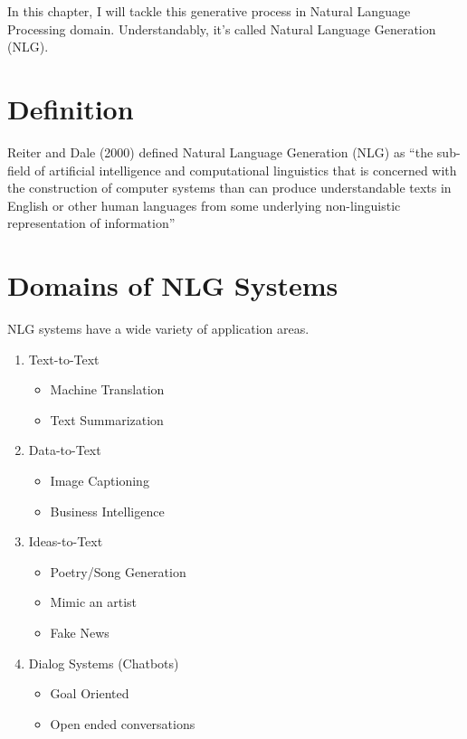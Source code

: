 \documentclass[]{krantz}
\providecommand{\tightlist}{%
  \setlength{\itemsep}{0pt}\setlength{\parskip}{0pt}}
\begin{document}
In this chapter, I will tackle this generative process in Natural Language Processing domain. Understandably, it's called Natural Language Generation (NLG).

\hypertarget{definition}{%
\section{Definition}\label{definition}}

Reiter and Dale (2000) defined Natural Language Generation (NLG) as ``the sub-field of artificial intelligence and computational linguistics that is concerned with the construction of computer systems than can produce understandable texts in English or other human languages from some underlying non-linguistic representation of information''

\hypertarget{domains-of-nlg-systems}{%
\section{Domains of NLG Systems}\label{domains-of-nlg-systems}}

NLG systems have a wide variety of application areas.

\begin{enumerate}
\def\labelenumi{\arabic{enumi}.}
\tightlist
\item
  Text-to-Text

  \begin{itemize}
  \tightlist
  \item
    Machine Translation
  \item
    Text Summarization
  \end{itemize}
\item
  Data-to-Text

  \begin{itemize}
  \tightlist
  \item
    Image Captioning
  \item
    Business Intelligence
  \end{itemize}
\item
  Ideas-to-Text

  \begin{itemize}
  \tightlist
  \item
    Poetry/Song Generation
  \item
    Mimic an artist
  \item
    Fake News
  \end{itemize}
\item
  Dialog Systems (Chatbots)

  \begin{itemize}
  \tightlist
  \item
    Goal Oriented
  \item
    Open ended conversations
  \end{itemize}
\end{enumerate}
\end{document}

